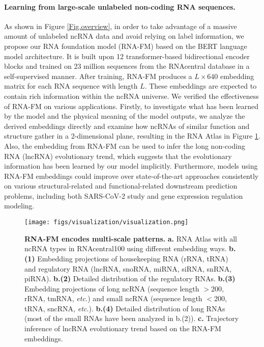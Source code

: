 \paragraph{Learning from large-scale unlabeled non-coding RNA sequences.}
As shown in Figure \ref{Fig.overview}, in order to take advantage of a massive amount of unlabeled ncRNA data and avoid relying on label information, we propose our RNA foundation model (RNA-FM) based on the BERT \cite{devlin2018bert} language model architecture. It is built upon 12 transformer-based bidirectional encoder blocks and trained on 23 million sequences from the RNAcentral database in a self-supervised manner.
After training, RNA-FM produces a $L\times640$ embedding matrix for each RNA sequence with length $L$. These embeddings are expected to contain rich information within the ncRNA universe. We verified the effectiveness of RNA-FM on various applications. Firstly, to investigate what has been learned by the model and the physical meaning of the model outputs, we analyze the derived embeddings directly and examine how ncRNAs of similar function and structure gather in a 2-dimensional plane, resulting in the RNA Atlas in Figure \ref{Fig.visual}. Also, the embedding from RNA-FM can be used to infer the long non-coding RNA (lncRNA) evolutionary trend, which suggests that the evolutionary information has been learned by our model implicitly. Furthermore, models using RNA-FM embeddings could improve over state-of-the-art approaches consistently on various structural-related and functional-related downstream prediction problems, including both SARS-CoV-2 study and gene expression regulation modeling.


\begin{figure}[!t]
\centering
\texttt{[image: figs/visualization/visualization.png]} 
\caption{\textbf{RNA-FM encodes multi-scale patterns.} \textbf{a.} RNA Atlas with all ncRNA types in RNAcentral100 using different embedding ways. 
\textbf{b.(1)} Embedding projections of housekeeping RNA (rRNA, tRNA) and regulatory RNA (lncRNA, snoRNA, miRNA, siRNA, snRNA, piRNA).
\textbf{b.(2)} Detailed distribution of the regulatory RNAs. 
\textbf{b.(3)} Embedding projections of long ncRNA (sequence length $>$200, rRNA, tmRNA, \textit{etc.}) and small ncRNA (sequence length $<$200, tRNA, sncRNA, \textit{etc.}). 
\textbf{b.(4)} Detailed distribution of long RNAs (most of the small RNAs have been analyzed in b.(2)). 
\textbf{c.} Trajectory inference of lncRNA evolutionary trend based on the RNA-FM embeddings.
}
\label{Fig.visual}
\end{figure}

